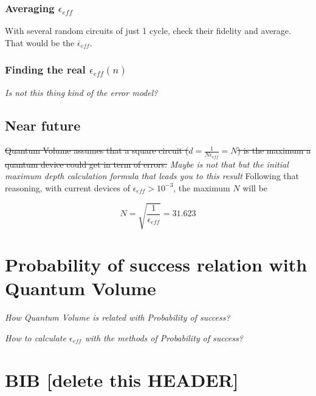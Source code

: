 \documentclass[11pt]{article}
\begin{document}
\subsubsection{Averaging \(\epsilon_{eff}\)}
\label{sec:org10a62c4}

With several random circuits of just 1 cycle, check their fidelity and average. That would be the \(\bar{\epsilon}_{eff}\).

\subsubsection{Finding the real \(\epsilon_{eff} (n)\)}
\label{sec:orgf85505b}

\emph{Is not this thing kind of the error model?}

\subsection{Near future}
\label{sec:orge920a3a}

\sout{Quantum Volume assumes that a square circuit (\(d = \frac{1}{N \epsilon_{eff}} = N\)) is the maximum a quantum device could get in term of errors.}
\emph{Maybe is not that but the initial maximum depth calculation formula that leads you to this result}
Following that reasoning, with current devices of \(\epsilon_{eff} > 10^{-3}\), the maximum \(N\) will be

$$N = \sqrt{\frac{1}{\epsilon_{eff}}} = 31.623$$


\section{Probability of success relation with Quantum Volume}
\label{sec:orgc91bed0}

\emph{How Quantum Volume is related with Probability of success?}

\emph{How to calculate \(\epsilon_{eff}\) with the methods of Probability of success?}



\section{BIB [delete this HEADER]}
\label{sec:org1eaca2e}



\end{document}
